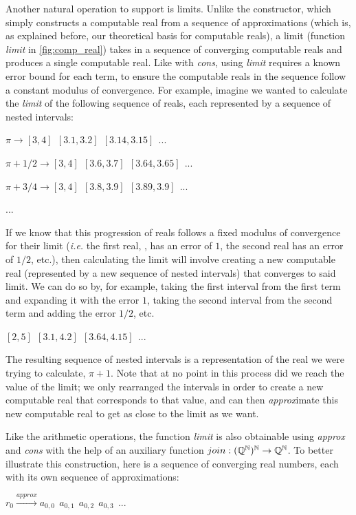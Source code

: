 Another natural operation to support is limits. Unlike the constructor, which simply constructs a computable real from a sequence of approximations (which is, as explained before, our theoretical basis for computable reals), a limit (function \textit{limit} in \cref{fig:comp_real}) takes in a sequence of converging computable reals and produces a single computable real. Like with \textit{cons}, using \textit{limit} requires a known error bound for each term, to ensure the computable reals in the sequence follow a constant modulus of convergence. For example, imagine we wanted to calculate the \textit{limit} of the following sequence of reals, each represented by a sequence of nested intervals:

$\pi \rightarrow [3,4]\ \ [3.1, 3.2]\ \ [3.14, 3.15]\ \ ...$

$\pi + 1/2 \rightarrow [3,4]\ \ [3.6, 3.7]\ \ [3.64, 3.65]\ \ ...$

$\pi + 3/4 \rightarrow [3,4]\ \ [3.8, 3.9]\ \ [3.89, 3.9]\ \ ...$

...

If we know that this progression of reals follows a fixed modulus of convergence for their limit (\textit{i.e.} the first real, \pi, has an error of $1$, the second real has an error of $1/2$, etc.), then calculating the limit will involve creating a new computable real (represented by a new sequence of nested intervals) that converges to said limit. We can do so by, for example, taking the first interval from the first term and expanding it with the error $1$, taking the second interval from the second term and adding the error $1/2$, etc.

$[2,5]\ \ [3.1, 4.2]\ \ [3.64, 4.15]\ \ ...$

The resulting sequence of nested intervals is a representation of the real we were trying to calculate, $\pi + 1$. Note that at no point in this process did we reach the value of the limit; we only rearranged the intervals in order to create a new computable real that corresponds to that value, and can then \textit{approx}imate this new computable real to get as close to the limit as we want.

Like the arithmetic operations, the function \textit{limit} is also obtainable using \textit{approx} and \textit{cons} with the help of an auxiliary function $join : (\mathbb{Q}^{\mathbb{N}})^{\mathbb{N}} \rightarrow \mathbb{Q}^{\mathbb{N}}$. To better illustrate this construction, here is a sequence of converging real numbers, each with its own sequence of approximations:

$r_0 \xrightarrow{approx} a_{0,0}\ \ a_{0,1}\ \ a_{0,2}\ \ a_{0,3}\ \ ...$

